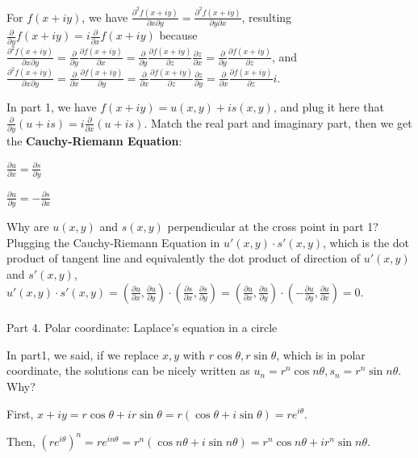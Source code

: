 \documentclass{article}
\newenvironment{nscenter}
{\parskip=0pt\par\nopagebreak\centering}
{\par\noindent\ignorespacesafterend}
\begin{document}
\begin{spacing}{1.5}
For $f(x+iy)$, we have $\frac{\partial^2 f(x+iy)}{\partial x \partial y}= \frac{\partial^2 f(x+iy)}{\partial y \partial x}$, resulting $\frac{\partial }{\partial y} f(x+iy)= 
i\frac{\partial }{\partial x} f(x+iy)$ because $\frac{\partial^2 f(x+iy)}{\partial x\partial y} = 
\frac{\partial }{\partial y} \frac{\partial f(x+iy)}{ \partial x} =
\frac{\partial }{\partial y}\frac{\partial f(x+iy)}{\partial z}\frac{\partial z}{\partial x}=
\frac{\partial }{\partial y}\frac{\partial f(x+iy)}{\partial z} $, and
$\frac{\partial^2 f(x+iy)}{\partial x\partial y} = 
\frac{\partial }{\partial x} \frac{\partial f(x+iy)}{ \partial y} =
\frac{\partial }{\partial x}\frac{\partial f(x+iy)}{\partial z}\frac{\partial z}{\partial y}=
\frac{\partial }{\partial x}\frac{\partial f(x+iy)}{\partial z}i $.

In part 1, we have $f(x+iy)=u(x, y) + is(x,y)$, and plug it here that $\frac{\partial }{\partial y}(u+is) = i\frac{\partial }{\partial x} (u+is)$. Match the real part and imaginary part, then we get the {\bfseries Cauchy-Riemann Equation}:
\begin{nscenter}
	$\frac{\partial u}{\partial x} = \frac{\partial s}{\partial y}$
	
	$\frac{\partial u}{\partial y} = -\frac{\partial s}{\partial x}$
\end{nscenter}
Why are $u(x,y)$ and $s(x, y)$ perpendicular at the cross point in part 1? Plugging the Cauchy-Riemann Equation in $u'(x,y) \cdot s'(x, y)$, which is the dot product of tangent line and equivalently the dot product of direction of $u'(x,y)$ and $s'(x, y)$, $u'(x,y) \cdot s'(x, y) = (\frac{\partial u}{\partial x}, \frac{\partial u}{\partial y}) \cdot (\frac{\partial s}{\partial x}, \frac{\partial s}{\partial y}) =  
(\frac{\partial u}{\partial x}, \frac{\partial u}{\partial y}) \cdot (-\frac{\partial u}{\partial y}, \frac{\partial u}{\partial x}) = 0$.
\\\\ Part 4. Polar coordinate: Laplace's equation in a circle

In part1, we said, if we replace $x, y$ with $r\cos \theta, r\sin \theta$, which is in polar coordinate, the solutions can be nicely written as $u_n=r^n\cos n\theta, s_n=r^n\sin n\theta$. Why?

First, $x+iy=r\cos \theta +i r\sin \theta=r(\cos \theta +i\sin \theta)=re^{i\theta}$.

Then, $(re^{i\theta})^n=re^{in\theta}=r^n(\cos n\theta + i \sin n\theta)=r^n \cos n\theta + i r^n \sin n\theta$.


\end{spacing}
\end{document}

